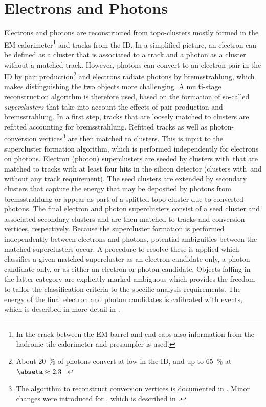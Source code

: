 \section{Electrons and Photons}
\label{sec:electron-photon-reconstruction}
Electrons and photons are reconstructed from topo-clusters mostly formed in the EM calorimeter\footnote{In the crack between the EM barrel and end-caps also information from the hadronic tile calorimeter and presampler is used.} and tracks from the ID.
In a simplified picture, an electron can be defined as a cluster that is associated to a track and a photon as a cluster without a matched track.
However, photons can convert to an electron pair in the ID by pair production\footnote{About \SI{20}{\percent} of photons convert at low \abseta in the ID, and up to \SI{65}{\percent} at $\abseta \approx 2.3$~\cite{EGAM-2018-01}.} and electrons radiate photons by bremsstrahlung, which makes distinguishing the two objects more challenging.
A multi-stage reconstruction algorithm is therefore used, based on the formation of so-called \emph{superclusters} that take into account the effects of pair production and bremsstrahlung.
In a first step, tracks that are loosely matched to clusters are refitted accounting for bremsstrahlung. Refitted tracks as well as photon-conversion vertices\footnote{The algorithm to reconstruct conversion vertices is documented in . Minor changes were introduced for \RunTwo, which is described in .} are then matched to clusters.
This is input to the supercluster formation algorithm, which is performed independently for electrons on photons.
Electron (photon) superclusters are seeded by clusters with \,\GeV that are matched to tracks with at least four hits in the silicon detector (clusters with \,\GeV and without any track requirement).
The seed clusters are extended by secondary clusters that capture the energy that may be deposited by photons from bremsstrahlung or appear as part of a splitted topo-cluster due to converted photons.
The final electron and photon superclusters consist of a seed cluster and associated secondary clusters and are then matched to tracks and conversion vertices, respectively.
Because the supercluster formation is performed independently between electrons and photons, potential ambiguities between the matched superclusters occur. A procedure to resolve these is applied which classifies a given matched supercluster as an electron candidate only, a photon candidate only, or as either an electron or photon candidate.
Objects falling in the latter category are explicitly marked ambiguous which provides the freedom to tailor the classification criteria to the specific analysis requirements.
The energy of the final electron and photon candidates is calibrated with \Zee events, which is described in more detail in .

